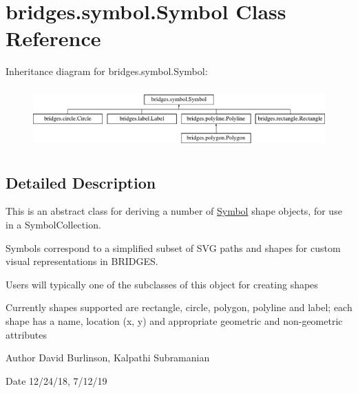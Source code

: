 \hypertarget{classbridges_1_1symbol_1_1_symbol}{}\section{bridges.\+symbol.\+Symbol Class Reference}
\label{classbridges_1_1symbol_1_1_symbol}
Inheritance diagram for bridges.\+symbol.\+Symbol\+:\begin{figure}[H]
\begin{center}
\leavevmode
\includegraphics[height=2.346369cm]{classbridges_1_1symbol_1_1_symbol}
\end{center}
\end{figure}


\subsection{Detailed Description}
This is an abstract class for deriving a number of \hyperlink{classbridges_1_1symbol_1_1_symbol}{Symbol} shape objects, for use in a Symbol\+Collection. 

Symbols correspond to a simplified subset of S\+VG paths and shapes for custom visual representations in B\+R\+I\+D\+G\+ES.

Users will typically one of the subclasses of this object for creating shapes

Currently shapes supported are rectangle, circle, polygon, polyline and label; each shape has a name, location (x, y) and appropriate geometric and non-\/geometric attributes

\begin{DoxyAuthor}{Author}
David Burlinson, Kalpathi Subramanian 
\end{DoxyAuthor}
\begin{DoxyDate}{Date}
12/24/18, 7/12/19 
\end{DoxyDate}
